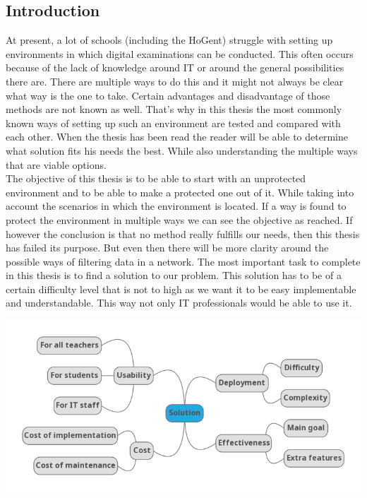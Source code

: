 \documentclass[a0,portrait]{a0poster}
\begin{document}
\begin{multicols}{2}
\begin{abstract}
\end{abstract}
\color{HoGentAccent1} 
\section*{Introduction}
\color{black}
\color{black}
At present, a lot of schools (including the HoGent) struggle with setting up environments in which digital examinations can be conducted. This often occurs because of the lack of knowledge around IT or around the general possibilities there are. There are multiple ways to do this and it might not always be clear what way is the one to take. Certain advantages and disadvantage  of those methods are not known as well. That's why in this thesis the most commonly known ways of setting up such an environment are tested and compared with each other. When the thesis has been read the reader will be able to determine what solution fits his needs the best. While also understanding the multiple ways that are viable options. 
\\
The objective of this thesis is to be able to start with an unprotected environment and to be able to make a protected one out of it. While taking into account the scenarios in which the environment is located. If a way is found to protect the environment in multiple ways we can see the objective as reached. If however the conclusion is that no method really fulfills our needs, then this thesis has failed its purpose. But even then there will be more clarity around the possible ways of filtering data in a network.
The most important task to complete in this thesis is to find a solution to our problem. This solution has to be of a certain difficulty level that is not to high as we want it to be easy implementable and understandable. This way not only IT professionals would be able to use it. 
\begin{center}\vspace{1cm}
\includegraphics[width=1.0\linewidth]{mindmap}
\end{center}


\end{multicols}
\end{document}
